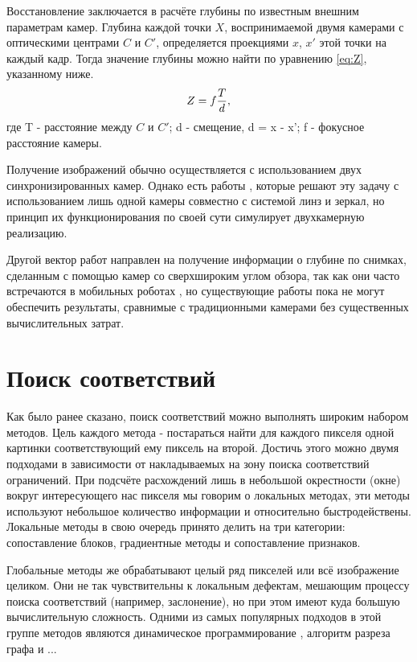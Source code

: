 Восстановление заключается в расчёте глубины по известным внешним параметрам камер. Глубина каждой точки $X$, воспринимаемой двумя камерами 
с оптическими центрами $C$ и $C'$, определяется проекциями $x$, $x'$ этой точки на каждый кадр. Тогда значение глубины можно найти по уравнению \ref{eq:Z}, указанному ниже. 
\begin{equation}	
	Z = f{T \over d},
	\label{eq:Z}
\end{equation}
где T - расстояние между $C$ и $C'$;
    d - смещение,  {d = x - x'};
	f - фокусное расстояние камеры.

Получение изображений обычно осуществляется с использованием двух синхронизированных камер. Однако есть работы \cite{singlecamrev,singlecam}, которые 
решают эту задачу с использованием лишь одной камеры совместно с системой линз и зеркал, но принцип их функционирования по своей сути 
 симулирует двухкамерную реализацию. 
 
 Другой вектор работ направлен на получение информации о глубине по снимках, сделанным с помощью камер со сверхшироким 
 углом обзора, так как они часто встречаются в мобильных роботах \cite{omnifisheye,roxas2019realtime}, но существующие работы пока не могут обеспечить результаты, 
 сравнимые с традиционными камерами без существенных вычислительных затрат. 

\section{Поиск соответствий}
\label{matching}
Как было ранее сказано, поиск соответствий можно выполнять широким набором методов. Цель каждого метода - постараться найти для каждого пикселя одной картинки 
соответствующий ему пиксель на второй. Достичь этого можно двумя подходами в зависимости от накладываемых на зону поиска соответствий ограничений.  При подсчёте 
расхождений лишь в небольшой окрестности (окне) вокруг интересующего нас пикселя мы говорим о локальных методах, эти методы  используют небольшое количество 
информации и относительно быстродействены. Локальные методы в свою очередь принято делить на три категории: сопоставление блоков, градиентные методы и 
сопоставление признаков. 		%

Глобальные методы же обрабатывают целый ряд пикселей или всё изображение целиком. Они не так чувствительны к локальным дефектам, мешающим процессу поиска соответствий 
(например, заслонение), но при этом имеют куда большую вычислительную сложность. Одними из самых популярных подходов в этой группе методов являются динамическое программирование \cite{dynamic_prog},
алгоритм разреза графа и ... %

